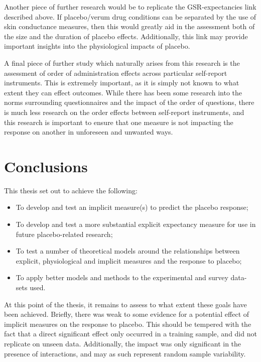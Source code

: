 Another piece of further research would be to replicate the GSR-expectancies link described above. If placebo/verum drug conditions can be separated by the use of skin conductance measures, then this would greatly aid in the assessment both of the size and the duration of placebo effects. Additionally, this link may provide important insights into the physiological impacts of placebo. 

A final piece of further study which naturally arises from this research is the assessment of order of administration effects across particular self-report instruments. This is extremely important, as it is simply not known to what extent they can effect outcomes. While there has been some research into the norms surrounding questionnaires and the impact of the order of questions, there is much less research on the order effects between self-report instruments, and this research is important to ensure that one measure is not impacting the response on another in unforeseen and unwanted ways. 


\section{Conclusions}
\label{sec:concl-furth-rese}


This thesis set out to achieve the following:

\begin{itemize}
\item To develop and test an implicit measure(s) to predict the
placebo response;
\item To develop and test a more substantial explicit expectancy
measure for use in future placebo-related research;
\item To test a number of theoretical models around the relationships
between explicit, physiological and implicit measures and the response
to placebo;
\item To apply better models and methods to the experimental and survey data-sets used.
\end{itemize}

At this point of the thesis, it remains to assess to what extent these
goals have been achieved. Briefly, there was weak to some evidence for
a potential effect of implicit measures on the response to placebo.
This should be tempered with the fact that a direct significant effect
only occurred in a training sample, and did not replicate on unseen
data. Additionally, the impact was only significant in the presence of
interactions, and may as such represent random sample variability.

